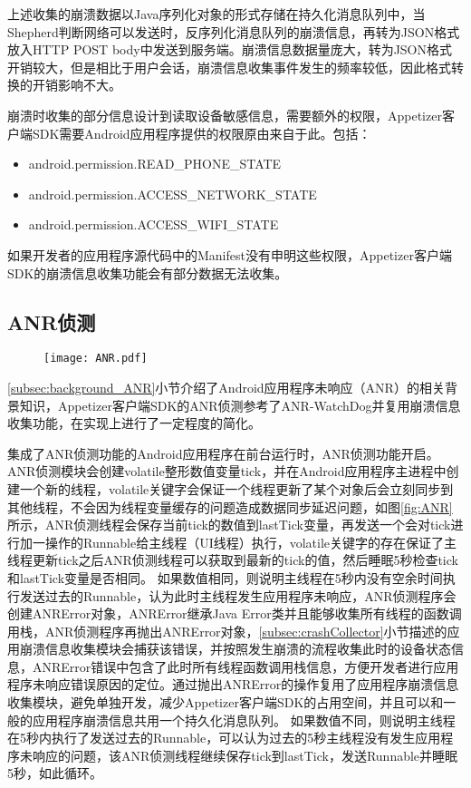 上述收集的崩溃数据以Java序列化对象的形式存储在持久化消息队列中，当Shepherd判断网络可以发送时，反序列化消息队列的崩溃信息，再转为JSON格式放入HTTP POST body中发送到服务端。崩溃信息数据量庞大，转为JSON格式开销较大，但是相比于用户会话，崩溃信息收集事件发生的频率较低，因此格式转换的开销影响不大。
 
 崩溃时收集的部分信息设计到读取设备敏感信息，需要额外的权限，Appetizer客户端SDK需要Android应用程序提供的权限原由来自于此。包括：
 
\begin{itemize}
 	\item android.permission.READ\_PHONE\_STATE
 	\item android.permission.ACCESS\_NETWORK\_STATE
 	\item android.permission.ACCESS\_WIFI\_STATE
\end{itemize}

如果开发者的应用程序源代码中的Manifest没有申明这些权限，Appetizer客户端SDK的崩溃信息收集功能会有部分数据无法收集。

\subsection{ANR侦测}
\label{subsec:ANRCollector}

\begin{figure}[!htp]
	\centering
	\texttt{[image: ANR.pdf]}
\end{figure}

\ref{subsec:background_ANR}小节介绍了Android应用程序未响应（ANR）的相关背景知识，Appetizer客户端SDK的ANR侦测参考了ANR-WatchDog\parencite{watchdog}并复用崩溃信息收集功能，在实现上进行了一定程度的简化。

集成了ANR侦测功能的Android应用程序在前台运行时，ANR侦测功能开启。ANR侦测模块会创建volatile整形数值变量tick，并在Android应用程序主进程中创建一个新的线程，volatile关键字会保证一个线程更新了某个对象后会立刻同步到其他线程，不会因为线程变量缓存的问题造成数据同步延迟问题，如图\ref{fig:ANR}所示，ANR侦测线程会保存当前tick的数值到lastTick变量，再发送一个会对tick进行加一操作的Runnable给主线程（UI线程）执行，volatile关键字的存在保证了主线程更新tick之后ANR侦测线程可以获取到最新的tick的值，然后睡眠5秒检查tick和lastTick变量是否相同。
如果数值相同，则说明主线程在5秒内没有空余时间执行发送过去的Runnable，认为此时主线程发生应用程序未响应，ANR侦测程序会创建ANRError对象，ANRError继承Java Error类并且能够收集所有线程的函数调用栈，ANR侦测程序再抛出ANRError对象，\ref{subsec:crashCollector}小节描述的应用崩溃信息收集模块会捕获该错误，并按照发生崩溃的流程收集此时的设备状态信息，ANRError错误中包含了此时所有线程函数调用栈信息，方便开发者进行应用程序未响应错误原因的定位。通过抛出ANRError的操作复用了应用程序崩溃信息收集模块，避免单独开发，减少Appetizer客户端SDK的占用空间，并且可以和一般的应用程序崩溃信息共用一个持久化消息队列。
如果数值不同，则说明主线程在5秒内执行了发送过去的Runnable，可以认为过去的5秒主线程没有发生应用程序未响应的问题，该ANR侦测线程继续保存tick到lastTick，发送Runnable并睡眠5秒，如此循环。

